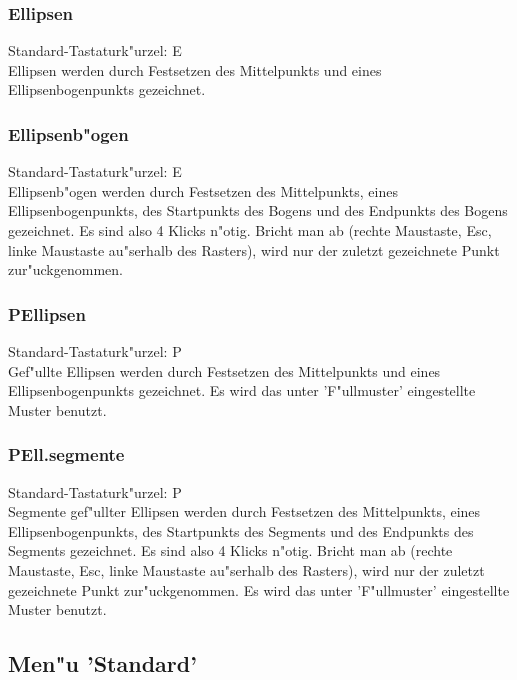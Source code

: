 \subsubsection{Ellipsen}
Standard-Tastaturk"urzel: E \\ 
Ellipsen werden durch Festsetzen des Mittelpunkts und eines
Ellipsenbogenpunkts gezeichnet.

\subsubsection{Ellipsenb"ogen}
Standard-Tastaturk"urzel: {\alternate}E \\ 
Ellipsenb"ogen werden durch Festsetzen des Mittelpunkts, eines
Ellipsenbogenpunkts, des Startpunkts des Bogens und des Endpunkts
des Bogens gezeichnet. Es sind also 4 Klicks n"otig. Bricht
man ab (rechte Maustaste, Esc, linke Maustaste au"serhalb des
Rasters), wird nur der zuletzt gezeichnete Punkt zur"uckgenommen.

\subsubsection{PEllipsen}
Standard-Tastaturk"urzel: P \\ 
 
Gef"ullte Ellipsen werden durch Festsetzen des Mittelpunkts und 
eines Ellipsenbogenpunkts gezeichnet. Es wird das unter 
'F"ullmuster' eingestellte Muster benutzt.

\subsubsection{PEll.segmente}
Standard-Tastaturk"urzel: {\alternate}P \\
 
Segmente gef"ullter Ellipsen werden durch Festsetzen des 
Mittelpunkts, eines Ellipsenbogenpunkts, des Startpunkts des 
Segments und des Endpunkts des Segments gezeichnet. Es sind also 
4 Klicks n"otig. Bricht man ab (rechte Maustaste, Esc, linke 
Maustaste au"serhalb des Rasters), wird nur der zuletzt gezeichnete 
Punkt zur"uckgenommen. Es wird das unter 'F"ullmuster' eingestellte 
Muster benutzt.

\newpage


\subsection{Men"u 'Standard'} 

